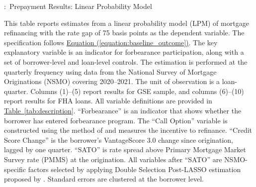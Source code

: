 \documentclass[11pt]{article}
\begin{document}
{\begin{table}[htbp]
\vspace{1em}




\end{table}
\FloatBarrier
\clearpage


\begin{table}[htbp]
\captionsetup{justification=justified,singlelinecheck=false}
\footnotesize
\caption{:\ Prepayment Results: Linear Probability Model}
\label{tab:lpm_prepayment_75bps}
\vspace{0.5em}

\begin{minipage}{\textwidth}
\small
This table reports estimates from a linear probability model (LPM) of mortgage refinancing with the rate gap of 75 basis points as the dependent variable. The specification follows \hyperref[equation:baseline_outcome]{Equation (\ref*{equation:baseline_outcome})}. The key explanatory variable is an indicator for forbearance participation, along with a set of borrower-level and loan-level controls. The estimation is performed at the quarterly frequency using data from the National Survey of Mortgage Originations (NSMO) covering 2020–2021. The unit of observation is a loan-quarter. Columns (1)–(5) report results for GSE sample, and columns (6)–(10) report results for FHA loans. All variable definitions are provided in \hyperref[tab:description]{Table~\ref*{tab:description}}. ``Forbearance'' is an indicator that shows whether the borrower has entered forbearance program. The ``Call Option'' variable is constructed using the method of \citet{deng2000mortgage} and measures the incentive to refinance. ``Credit Score Change'' is the borrower’s VantageScore 3.0 change since origination, lagged by one quarter. ``SATO'' is rate spread above Primary Mortgage Market Survey rate (PMMS) at the origination. All variables after ``SATO'' are NSMO-specific factors selected by applying Double Selection Post-LASSO estimation proposed by \citet{belloni2014inference}. Standard errors are clustered at the borrower level. 

\end{minipage}

\vspace{1em}




\end{table}
\FloatBarrier
\clearpage



}
\end{document}
